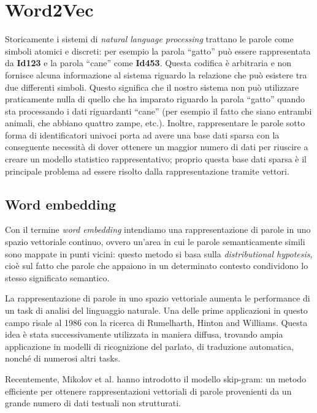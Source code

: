 \documentclass[a4paper,12pt,openright,twoside]{report}
\theoremstyle{definition}
\begin{document}
\section{Word2Vec}
\label{sec:word2vec}
Storicamente i sistemi di \emph{natural language processing} trattano le parole come simboli atomici e discreti:
per esempio la parola ``gatto'' può essere rappresentata da \textbf{Id123} e la parola ``cane'' come \textbf{Id453}.
Questa codifica è arbitraria e non fornisce alcuna informazione al sistema riguardo la relazione
che può esistere tra due differenti simboli.
Questo significa che il nostro sistema non può utilizzare praticamente nulla di quello che ha imparato
riguardo la parola ``gatto'' quando sta processando i dati riguardanti ``cane'' (per esempio il fatto che siano
entrambi animali, che abbiano quattro zampe, etc.).
Inoltre, rappresentare le parole sotto forma di identificatori univoci porta ad avere una base dati sparsa
con la conseguente necessità di dover ottenere un maggior numero di dati per riuscire a creare un modello
statistico rappresentativo; proprio questa base dati sparsa è il principale problema 
ad essere risolto dalla rappresentazione tramite vettori.

\subsection{Word embedding}
Con il termine \emph{word embedding} intendiamo una rappresentazione di parole in uno spazio vettoriale 
continuo, ovvero un'area in cui le parole
semanticamente simili sono mappate in punti vicini: questo metodo si basa sulla \emph{distributional hypotesis}, 
cioè sul fatto che parole che appaiono in 
un determinato contesto condividono lo stesso significato semantico.

La rappresentazione di parole in uno spazio vettoriale aumenta le performance
di un task di analisi del linguaggio naturale. Una delle prime
applicazioni in questo campo risale al 1986 con la ricerca di Rumelharth, Hinton and Williams.
Questa idea è stata successivamente utilizzata in maniera diffusa, trovando ampia 
applicazione in modelli di ricognizione del parlato,
di traduzione automatica, nonché di numerosi altri tasks.

Recentemente, Mikolov et al. hanno introdotto il modello skip-gram: 
un metodo efficiente per ottenere
rappresentazioni vettoriali di parole provenienti da un grande numero di dati testuali non strutturati.
\end{document}
